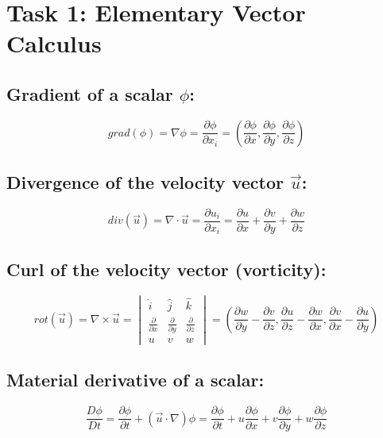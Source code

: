 \documentclass{article}
\begin{document}
\small

\section{Task 1: Elementary Vector Calculus}
 
\subsection{Gradient of a scalar $\phi$:}
    \begin{equation}
        grad(\phi) = \nabla \phi = \frac{\partial \phi}{\partial x_i} = \left( \frac{\partial \phi}{\partial x}, \frac{\partial \phi}{\partial y}, \frac{\partial \phi}{\partial z} \right)
    \end{equation}
\subsection{Divergence of the velocity vector $\vec{u}$:}
    \begin{equation}
        div(\vec{u}) = \nabla \cdot \vec{u} = \frac{\partial u_i}{\partial x_i} = \frac{\partial u}{\partial x} + \frac{\partial v}{\partial y} + \frac{\partial w}{\partial z}
    \end{equation}
\subsection{Curl of the velocity vector (vorticity):}
    \begin{equation}
        rot(\vec{u}) = \nabla \times \vec{u} = 
        \begin{vmatrix}
        \hat{i} & \hat{j} & \hat{k} \\
        \frac{\partial}{\partial x} & \frac{\partial}{\partial y} & \frac{\partial}{\partial z} \\
        u & v & w
        \end{vmatrix}
    = \left( \frac{\partial w}{\partial y} - \frac{\partial v}{\partial z}, \frac{\partial u}{\partial z} - \frac{\partial w}{\partial x}, \frac{\partial v}{\partial x} - \frac{\partial u}{\partial y} \right)
    \end{equation}
\subsection{Material derivative of a scalar:}
    \begin{equation}
        \frac{D\phi}{Dt} = \frac{\partial \phi}{\partial t} + (\vec{u} \cdot \nabla) \phi = \frac{\partial \phi}{\partial t} + u \frac{\partial \phi}{\partial x} + v \frac{\partial \phi}{\partial y} + w \frac{\partial \phi}{\partial z}
    \end{equation}
\end{document}
